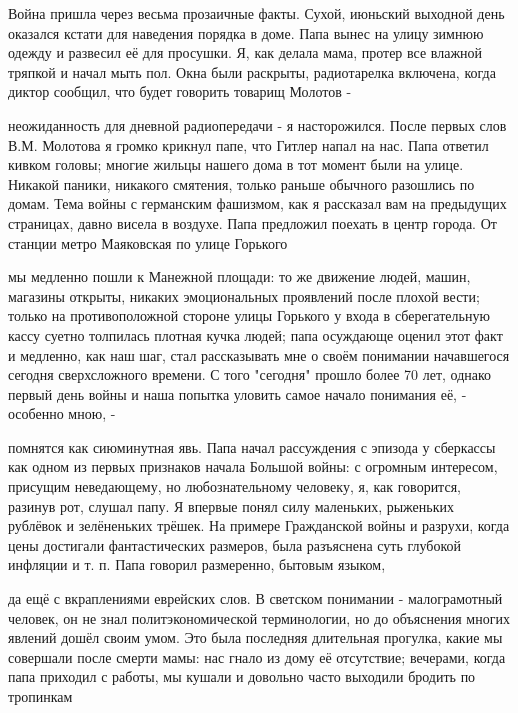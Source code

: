 \label{198-1}
Война пришла через весьма прозаичные факты. Сухой, июньский выходной день оказался кстати для наведения порядка в доме. Папа вынес на улицу зимнюю одежду и развесил её для просушки. Я, как делала мама, протер все влажной тряпкой и начал мыть пол. Окна были раскрыты, радиотарелка включена, когда диктор сообщил, что будет говорить товарищ Молотов - 

\label{198-2}
неожиданность для дневной радиопередачи - я насторожился. После первых слов В.М. Молотова я громко крикнул папе, что Гитлер напал на нас. Папа ответил кивком головы; многие жильцы нашего дома в тот момент были на улице. Никакой паники, никакого смятения, только раньше обычного разошлись по домам. Тема войны с германским фашизмом, как я рассказал вам на предыдущих страницах, давно висела в воздухе. Папа предложил поехать в центр города. От станции метро Маяковская по улице Горького

\label{199-1}
мы медленно пошли к Манежной площади: то же движение людей, машин, магазины открыты, никаких эмоциональных проявлений после плохой вести; только на противоположной стороне улицы Горького у входа в сберегательную кассу суетно толпилась плотная кучка людей; папа осуждающе оценил этот факт и медленно, как наш шаг, стал рассказывать мне о своём понимании начавшегося сегодня сверхсложного времени. С того "сегодня" прошло более 70 лет, однако первый день войны и наша попытка уловить самое начало понимания её, - особенно мною, -

\label{200-1}
помнятся как сиюминутная явь. Папа начал рассуждения с эпизода у сберкассы как одном из первых признаков начала Большой войны: с огромным интересом, присущим неведающему, но любознательному человеку, я, как говорится, разинув рот, слушал папу. Я впервые понял силу маленьких, рыженьких рублёвок и зелёненьких трёшек. На примере Гражданской войны и разрухи, когда цены достигали фантастических размеров, была разъяснена суть глубокой инфляции и т. п. Папа говорил размеренно, бытовым языком,

\label{201-1}
 да ещё с вкраплениями еврейских слов. В светском понимании - малограмотный человек, он не знал политэкономической терминологии, но до объяснения многих явлений дошёл своим умом. Это была последняя длительная прогулка, какие мы совершали после смерти мамы: нас гнало из дому её отсутствие; вечерами, когда папа приходил с работы, мы кушали и довольно часто выходили бродить по тропинкам

